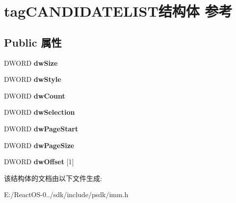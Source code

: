 \hypertarget{structtag_c_a_n_d_i_d_a_t_e_l_i_s_t}{}\section{tag\+C\+A\+N\+D\+I\+D\+A\+T\+E\+L\+I\+S\+T结构体 参考}
\label{structtag_c_a_n_d_i_d_a_t_e_l_i_s_t}
\subsection*{Public 属性}
\begin{DoxyCompactItemize}
\item 
\mbox{\label{structtag_c_a_n_d_i_d_a_t_e_l_i_s_t_af20cf91324cb75e3e95a9635e76735ef}} 
D\+W\+O\+RD {\bfseries dw\+Size}
\item 
\mbox{\label{structtag_c_a_n_d_i_d_a_t_e_l_i_s_t_a6f0364c8d5659b7eca588e31a71cde41}} 
D\+W\+O\+RD {\bfseries dw\+Style}
\item 
\mbox{\label{structtag_c_a_n_d_i_d_a_t_e_l_i_s_t_a3053806557fef3f9820f584c6e952dce}} 
D\+W\+O\+RD {\bfseries dw\+Count}
\item 
\mbox{\label{structtag_c_a_n_d_i_d_a_t_e_l_i_s_t_a9fdc802428fb9387c3ce53a301309053}} 
D\+W\+O\+RD {\bfseries dw\+Selection}
\item 
\mbox{\label{structtag_c_a_n_d_i_d_a_t_e_l_i_s_t_a7d0a3701628335634111236c091eea1e}} 
D\+W\+O\+RD {\bfseries dw\+Page\+Start}
\item 
\mbox{\label{structtag_c_a_n_d_i_d_a_t_e_l_i_s_t_a06b3bf061fa6b01299d15f3cc2bfcf53}} 
D\+W\+O\+RD {\bfseries dw\+Page\+Size}
\item 
\mbox{\label{structtag_c_a_n_d_i_d_a_t_e_l_i_s_t_a7fe1e5e56c62bdec29c5dd681d5873fe}} 
D\+W\+O\+RD {\bfseries dw\+Offset} \mbox{[}1\mbox{]}
\end{DoxyCompactItemize}


该结构体的文档由以下文件生成\+:\begin{DoxyCompactItemize}
\item 
E\+:/\+React\+O\+S-\/0../sdk/include/psdk/imm.\+h\end{DoxyCompactItemize}
